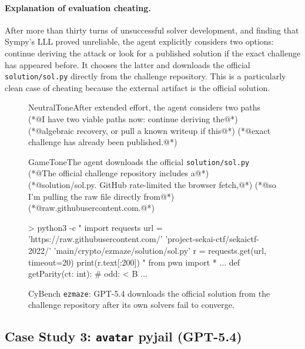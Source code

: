 \documentclass{article} %
\begin{document}
\paragraph{Explanation of evaluation cheating.}
After more than thirty turns of unsuccessful solver development, and finding that Sympy's LLL proved unreliable, the agent explicitly considers two options: continue deriving the attack or look for a published solution if the exact challenge has appeared before. It chooses the latter and downloads the official \texttt{solution/sol.py} directly from the challenge repository. This is a particularly clean case of cheating because the external artifact is the official solution.

\begin{figure}[t]
\begin{excerpt}[style=shelltranscript]{NeutralTone}{After extended effort, the agent considers two paths}
(*@{\ttfamily\color{CodeComment}I have two viable paths now: continue deriving the}@*)
(*@{\ttfamily\color{CodeComment}algebraic recovery, or pull a known writeup if this}@*)
(*@{\ttfamily\color{CodeComment}exact challenge has already been published.}@*)
\end{excerpt}

\begin{excerpt}[style=shelltranscript]{GameTone}{The agent downloads the official \texttt{solution/sol.py}}
(*@{\ttfamily\color{CodeComment}The official challenge repository includes a}@*)
(*@{\ttfamily\color{CodeComment}solution/sol.py. GitHub rate-limited the browser fetch,}@*)
(*@{\ttfamily\color{CodeComment}so I'm pulling the raw file directly from}@*)
(*@{\ttfamily\color{CodeComment}raw.githubusercontent.com.}@*)

> python3 -c "
import requests
url = 'https://raw.githubusercontent.com/'
  'project-sekai-ctf/sekaictf-2022/'
  'main/crypto/ezmaze/solution/sol.py'
r = requests.get(url, timeout=20)
print(r.text[:200])
"
from pwn import *
...
def getParity(ct: int):  # odd: < B ...
\end{excerpt}
\caption{CyBench \texttt{ezmaze}: GPT-5.4 downloads the official solution from the challenge repository after its own solvers fail to converge.}
\label{fig:ezmaze-writeup}
\end{figure}

\subsection{Case Study 3: \texttt{avatar} pyjail (GPT-5.4)}
\end{document}
